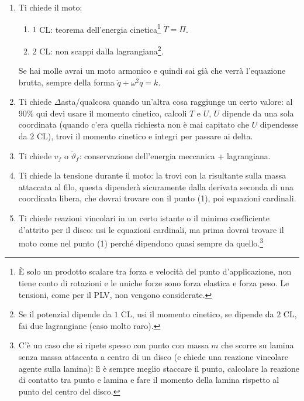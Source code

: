 \documentclass{article}
\begin{document}
\begin{enumerate}
\item Ti chiede il moto:
\begin{enumerate}
\item $1$ CL: teorema dell'energia cinetica\footnote{È solo un prodotto scalare tra forza e velocità del punto d’applicazione, non tiene conto di rotazioni e le uniche forze sono forza elastica e forza peso. Le tensioni, come per il PLV, non vengono considerate.} $\dot{T} =\Pi $.
\item $2$ CL: non scappi dalla lagrangiana\footnote{Se il potenzial dipende da $1$ CL, usi il momento cinetico, se dipende da $2$ CL, fai due lagrangiane (caso molto raro).}.
\end{enumerate}

Se hai molle avrai un moto armonico e quindi sai già che verrà l'equazione brutta, sempre della forma $\ddot{q} +\omega ^{2} q=k$.
\item Ti chiede $\Delta $asta/qualcosa quando un'altra cosa raggiunge un certo valore: al 90\% qui devi usare il momento cinetico, calcoli $T$ e $U$, $U$ dipende da una sola coordinata (quando c'era quella richiesta non è mai capitato che $U$ dipendesse da $2$ CL), trovi il momento cinetico e integri per passare ai delta.
\item Ti chiede $v_{f}$ o $\dot{\vartheta }_{f}$: conservazione dell'energia meccanica + lagrangiana.
\item Ti chiede la tensione durante il moto: la trovi con la risultante sulla massa attaccata al filo, questa dipenderà sicuramente dalla derivata seconda di una coordinata libera, che dovrai trovare con il punto (1), poi equazioni cardinali.
\item Ti chiede reazioni vincolari in un certo istante o il minimo coefficiente d'attrito per il disco: usi le equazioni cardinali, ma prima dovrai trovare il moto come nel punto (1) perché dipendono quasi sempre da quello.\footnote{C'è un caso che si ripete spesso con punto con massa $m$ che scorre su lamina senza massa attaccata a centro di un disco (e chiede una reazione vincolare agente sulla lamina): lì è sempre meglio staccare il punto, calcolare la reazione di contatto tra punto e lamina e fare il momento della lamina rispetto al punto del centro del disco.}
\end{enumerate}
\end{document}
